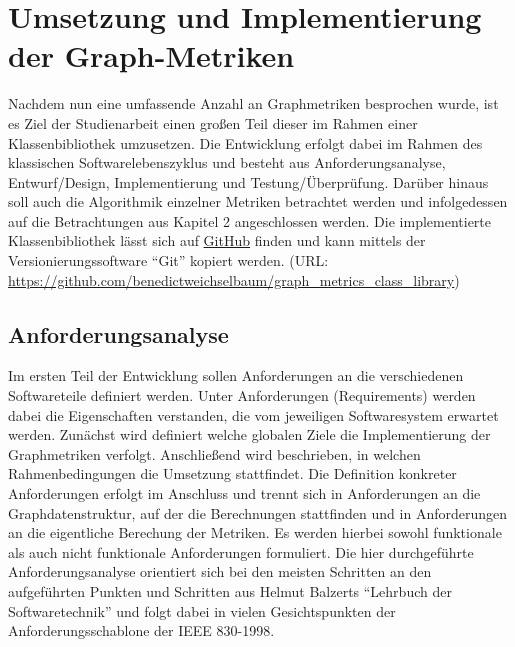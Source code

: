 \documentclass[a4paper,12pt,ngerman,chapterprefix=false,listof=totoc,bibliography=totoc]{scrreprt}
\begin{document}
{\chapter{Umsetzung und Implementierung der Graph-Metriken}
{
Nachdem nun eine umfassende Anzahl an Graphmetriken besprochen wurde, ist es Ziel der Studienarbeit einen großen Teil dieser im Rahmen einer Klassenbibliothek umzusetzen. Die Entwicklung erfolgt dabei im Rahmen des klassischen Softwarelebenszyklus und besteht aus Anforderungsanalyse, Entwurf/Design, Implementierung und Testung/Überprüfung. \cite{balzert_lehrbuch_2009,balzert_lehrbuch_2011} Darüber hinaus soll auch die Algorithmik einzelner Metriken betrachtet werden und infolgedessen auf die Betrachtungen aus Kapitel 2 angeschlossen werden. Die implementierte Klassenbibliothek lässt sich auf \href{https://github.com/benedictweichselbaum/graph_metrics_class_library}{GitHub} finden und kann mittels der Versionierungssoftware "`Git"' kopiert werden. (URL: \url{https://github.com/benedictweichselbaum/graph_metrics_class_library})
}
\section{Anforderungsanalyse}
{
Im ersten Teil der Entwicklung sollen Anforderungen an die verschiedenen Softwareteile definiert werden. Unter Anforderungen (Requirements) werden dabei die Eigenschaften verstanden, die vom jeweiligen Softwaresystem erwartet werden. Zunächst wird definiert welche globalen Ziele die Implementierung der Graphmetriken verfolgt. Anschließend wird beschrieben, in welchen Rahmenbedingungen die Umsetzung stattfindet. Die Definition konkreter Anforderungen erfolgt im Anschluss und trennt sich in Anforderungen an die Graphdatenstruktur, auf der die Berechnungen stattfinden und in Anforderungen an die eigentliche Berechung der Metriken. Es werden hierbei sowohl funktionale als auch nicht funktionale Anforderungen formuliert. Die hier durchgeführte Anforderungsanalyse orientiert sich bei den meisten Schritten an den aufgeführten Punkten und Schritten aus Helmut Balzerts "`Lehrbuch der Softwaretechnik"' und folgt dabei in vielen Gesichtspunkten der Anforderungsschablone der IEEE 830-1998. \cite{balzert_lehrbuch_2009,ieee_ieee_1998}
}
}
\end{document}
